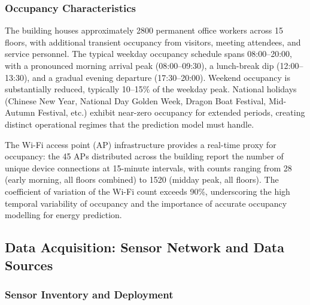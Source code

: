 \documentclass[11pt]{article}
\begin{document}
\subsubsection{Occupancy Characteristics}

The building houses approximately 2800 permanent office workers across 15 floors, with additional transient occupancy from visitors, meeting attendees, and service personnel. The typical weekday occupancy schedule spans 08:00–20:00, with a pronounced morning arrival peak (08:00–09:30), a lunch-break dip (12:00–13:30), and a gradual evening departure (17:30–20:00). Weekend occupancy is substantially reduced, typically 10–15\% of the weekday peak. National holidays (Chinese New Year, National Day Golden Week, Dragon Boat Festival, Mid-Autumn Festival, etc.) exhibit near-zero occupancy for extended periods, creating distinct operational regimes that the prediction model must handle.

The Wi-Fi access point (AP) infrastructure provides a real-time proxy for occupancy: the 45 APs distributed across the building report the number of unique device connections at 15-minute intervals, with counts ranging from 28 (early morning, all floors combined) to 1520 (midday peak, all floors). The coefficient of variation of the Wi-Fi count exceeds 90\%, underscoring the high temporal variability of occupancy and the importance of accurate occupancy modelling for energy prediction.

\subsection{Data Acquisition: Sensor Network and Data Sources}

\subsubsection{Sensor Inventory and Deployment}
\end{document}
